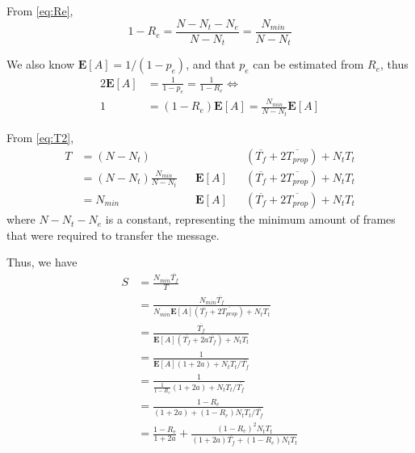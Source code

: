 \documentclass[a4paper, 11pt]{report}
\newcommand\expected[1]{\mathbf{E}[#1]}
\begin{document}
From \ref{eq:Re},
\begin{equation}
	1-R_e = \frac{N - N_t - N_e}{N-N_t} = \frac{N_{min}}{N-N_t}
\end{equation}

We also know $\expected{A} = 1/(1-p_e)$, and that $p_e$ can be estimated from $R_e$, thus
\begin{alignat}{2}
	\expected{A} &= \frac{1}{1-p_e} = \frac{1}{1-R_e} \iff \\
	1 &= (1-R_e)\expected{A} = \frac{N_{min}}{N-N_t}\expected{A}
\end{alignat}

From \ref{eq:T2},
\begin{equation}
	\begin{alignedat}{5}
		T
		& = (N-N_t)                       &&              && (\overline{T_f} + 2\overline{T_{prop}}) + N_t T_t \\
		& = (N-N_t) \frac{N_{min}}{N-N_t} && \expected{A} && (\overline{T_f} + 2\overline{T_{prop}}) + N_t T_t \\
		& = N_{min}                       && \expected{A} && (\overline{T_f} + 2\overline{T_{prop}}) + N_t T_t
	\end{alignedat}
\end{equation}
where $N-N_t-N_e$ is a constant, representing the minimum amount of frames that were required to transfer the message.

Thus, we have
\begin{equation} \label{eq:S_rel}
\begin{alignedat}{2}
	S
	&= \frac{N_{min}\overline{T_f}}{T} \\
	&= \frac{N_{min}\overline{T_f}}{N_{min} \expected{A}(\overline{T_f} + 2\overline{T_{prop}}) + N_t T_t} \\
	&= \frac{\overline{T_f}}{\expected{A}(\overline{T_f} + 2a\overline{T_f}) + N_t T_t} \\
	&= \frac{1}{\expected{A}(1 + 2a) + N_t T_t / \overline{T_f}} \\
	&= \frac{1}{\frac{1}{1-R_e}(1 + 2a) + N_t T_t / \overline{T_f}} \\
	&= \frac{1-R_e}{(1 + 2a) + (1-R_e) N_t T_t / \overline{T_f}} \\
	&= \frac{1-R_e}{1 + 2a} + \frac{(1-R_e)^2 N_t T_t}{(1 + 2a)\overline{T_f} + (1-R_e) N_t T_t}
\end{alignedat}
\end{equation}
\end{document}
